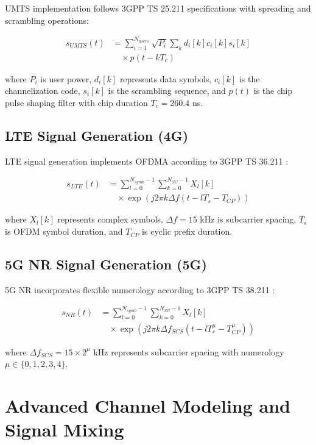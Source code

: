 \documentclass[twocolumn]{article}
\begin{document}
UMTS implementation follows 3GPP TS 25.211 specifications \cite{3gpp2018ts25211} with spreading and scrambling operations:

\begin{align}
s_{UMTS}(t) &= \sum_{i=1}^{N_{users}} \sqrt{P_i} \sum_{k} d_i[k] c_i[k] s_i[k] \nonumber \\
&\quad \times p(t-kT_c)
\end{align}

where $P_i$ is user power, $d_i[k]$ represents data symbols, $c_i[k]$ is the channelization code, $s_i[k]$ is the scrambling sequence, and $p(t)$ is the chip pulse shaping filter with chip duration $T_c = 260.4$ ns.

\subsection{LTE Signal Generation (4G)}

LTE signal generation implements OFDMA according to 3GPP TS 36.211 \cite{3gpp2018ts36211}:

\begin{align}
s_{LTE}(t) &= \sum_{l=0}^{N_{symb}-1} \sum_{k=0}^{N_{SC}-1} X_l[k] \nonumber \\
&\quad \times \exp(j2\pi k \Delta f (t-lT_s-T_{CP}))
\end{align}

where $X_l[k]$ represents complex symbols, $\Delta f = 15$ kHz is subcarrier spacing, $T_s$ is OFDM symbol duration, and $T_{CP}$ is cyclic prefix duration.

\subsection{5G NR Signal Generation (5G)}

5G NR incorporates flexible numerology according to 3GPP TS 38.211 \cite{3gpp2020ts38211}:

\begin{align}
s_{NR}(t) &= \sum_{l=0}^{N_{symb}-1} \sum_{k=0}^{N_{SC}-1} X_l[k] \nonumber \\
&\quad \times \exp(j2\pi k \Delta f_{SCS} (t-lT_s^{\mu}-T_{CP}^{\mu}))
\end{align}

where $\Delta f_{SCS} = 15 \times 2^\mu$ kHz represents subcarrier spacing with numerology $\mu \in \{0,1,2,3,4\}$.

\section{Advanced Channel Modeling and Signal Mixing}
\end{document}
